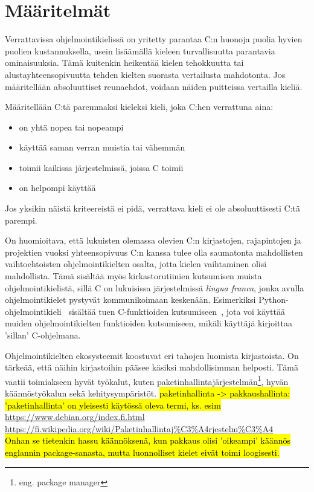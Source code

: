 \section{Määritelmät} 

Verrattavissa ohjelmointikielissä on yritetty parantaa C:n huonoja puolia
hyvien puolien kustannuksella, usein lisäämällä kieleen turvallisuutta
parantavia ominaisuuksia. Tämä kuitenkin heikentää kielen tehokkuutta tai
alustayhteensopivuutta tehden kielten suorasta vertailusta mahdotonta. Jos
määritellään absoluuttiset reunaehdot, voidaan näiden puitteissa vertailla
kieliä.

Määritellään C:tä paremmaksi kieleksi kieli, joka C:hen verrattuna aina:

\begin{itemize}
    \item on yhtä nopea tai nopeampi
    \item käyttää saman verran muistia tai vähemmän
    \item toimii kaikissa järjestelmissä, joissa C toimii
    \item on helpompi käyttää
\end{itemize}

Jos yksikin näistä kriteereistä ei pidä, verrattava kieli ei ole absoluuttisesti
C:tä parempi.

On huomioitava, että lukuisten olemassa olevien C:n kirjastojen, rajapintojen
ja projektien vuoksi yhteensopivuus C:n kanssa tulee olla saumatonta
mahdollisten vaihtoehtoisten ohjelmointikielten osalta, jotta kielen
vaihtaminen olisi mahdollista. Tämä sisältää myös kirkastorutiinien kutsumisen
muista ohjelmointikielistä, sillä C on lukuisissa järjestelmissä \emph{lingua
franca}, jonka avulla ohjelmointikielet pystyvät kommunikoimaan keskenään.
Esimerkiksi Python-ohjelmointikieli~\citep{python} sisältää tuen C-funktioiden
kutsumiseen~\citep{pythonffi}, jota voi käyttää muiden ohjelmointikielten
funktioiden kutsumiseen, mikäli käyttäjä kirjoittaa 'sillan' C-ohjelmana.

Ohjelmointikielten ekosysteemit koostuvat eri tahojen luomista kirjastoista. On
tärkeää, että näihin kirjastoihin pääsee käsiksi mahdollisimman helposti. Tämä
vaatii toimiakseen hyvät työkalut, kuten
paketinhallintajärjestelmän\footnote{eng. package manager}, hyvän
käännöstyökalun sekä kehitysympäristöt. \hl{paketinhallinta -> pakkaushallinta:
'paketinhallinta' on yleisesti käytössä oleva termi, ks. esim} \\
\url{https://www.debian.org/index.fi.html} \\
\url{https://fi.wikipedia.org/wiki/Paketinhallintaj\%C3\%A4rjestelm\%C3\%A4} \\
\hl{Onhan se tietenkin hassu käännöksenä, kun pakkaus olisi 'oikeampi' käännös
englannin package-sanasta, mutta luonnolliset kielet eivät toimi loogisesti.}

